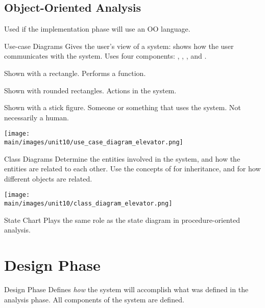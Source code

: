 \documentclass[\main/notes.tex]{subfiles}
\begin{document}
			\subsection{Object-Oriented Analysis}
				Used if the implementation phase will use an OO language.
				\begin{definition}{Use-case Diagrams}
					Gives the user's view of a system: shows how the user communicates with the system. Uses four components: , , , and .
					\begin{indentparagraph}
						\begin{description}[nosep]
							\item[System] Shown with a rectangle. Performs a function.
							\item[Use cases] Shown with rounded rectangles. Actions in the system.
							\item[Actor] Shown with a stick figure. Someone or something that uses the system. Not necessarily a human.
						\end{description}
					\end{indentparagraph}
					\begin{center}
						\texttt{[image: \\main/images/unit10/use\_case\_diagram\_elevator.png]}
					\end{center}
				\end{definition}
				\begin{definition}{Class Diagrams}
					Determine the entities involved in the system, and how the entities are related to each other. Use the concepts of  for inheritance, and  for how different objects are related.
					\begin{center}
						\texttt{[image: \\main/images/unit10/class\_diagram\_elevator.png]}
					\end{center}
				\end{definition}
				\begin{definition}{State Chart}
					Plays the same role as the state diagram in procedure-oriented analysis.
				\end{definition}
		\pagebreak

		\section{Design Phase}
			\begin{definition}{Design Phase}
				Defines \emph{how} the system will accomplish what was defined in the analysis phase. All components of the system are defined.
			\end{definition}
\end{document}
